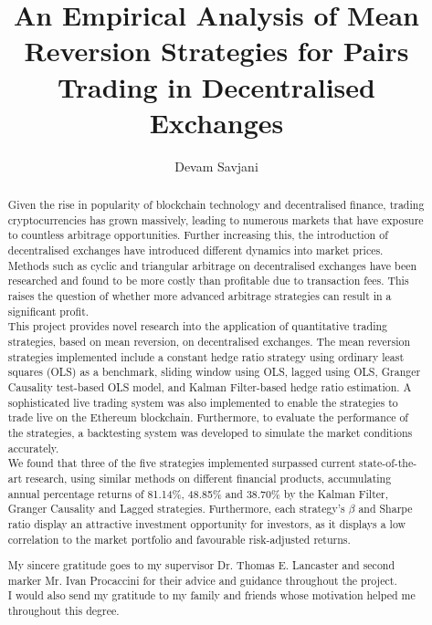 \documentclass[a4paper, 11pt]{report}
\title{An Empirical Analysis of Mean Reversion Strategies for Pairs Trading in Decentralised Exchanges}
\author{Devam Savjani}
\begin{document}


\begin{abstract}
Given the rise in popularity of blockchain technology and decentralised finance, trading cryptocurrencies has grown massively, leading to numerous markets that have exposure to countless arbitrage opportunities. Further increasing this, the introduction of decentralised exchanges have introduced different dynamics into market prices. Methods such as cyclic and triangular arbitrage on decentralised exchanges have been researched and found to be more costly than profitable due to transaction fees. This raises the question of whether more advanced arbitrage strategies can result in a significant profit.
\\[3mm]
This project provides novel research into the application of quantitative trading strategies, based on mean reversion, on decentralised exchanges. The mean reversion strategies implemented include a constant hedge ratio strategy using ordinary least squares (OLS) as a benchmark, sliding window using OLS, lagged using OLS, Granger Causality test-based OLS model, and Kalman Filter-based hedge ratio estimation. A sophisticated live trading system was also implemented to enable the strategies to trade live on the Ethereum blockchain. Furthermore, to evaluate the performance of the strategies, a backtesting system was developed to simulate the market conditions accurately. 
\\[3mm]
We found that three of the five strategies implemented surpassed current state-of-the-art research, using similar methods on different financial products, accumulating annual percentage returns of 81.14\%, 48.85\% and 38.70\% by the Kalman Filter, Granger Causality and Lagged strategies. Furthermore, each strategy's $\beta$ and Sharpe ratio display an attractive investment opportunity for investors, as it displays a low correlation to the market portfolio and favourable risk-adjusted returns.
\end{abstract}

\renewcommand{\abstractname}{Acknowledgements}
\begin{abstract}
My sincere gratitude goes to my supervisor Dr. Thomas E. Lancaster and second marker Mr. Ivan Procaccini for their advice and guidance throughout the project.
\\[3mm]
I would also send my gratitude to my family and friends whose motivation helped me throughout this degree.
\end{abstract}

\tableofcontents












\end{document}
